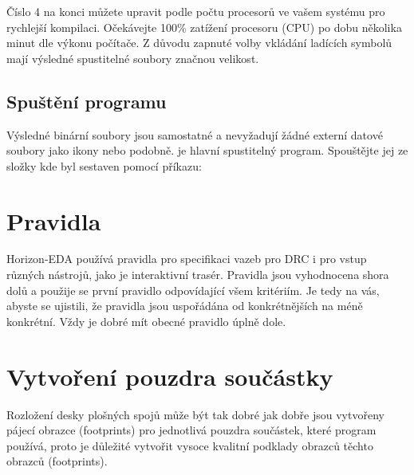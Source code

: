 \documentclass[letterpaper,10pt,czech]{sphinxmanual}
\begin{document}
Číslo 4 na konci můžete upravit podle počtu procesorů ve vašem systému pro rychlejší kompilaci. Očekávejte 100\% zatížení procesoru (CPU) po dobu několika minut dle výkonu počítače. Z důvodu zapnuté volby vkládání ladících symbolů mají výsledné spustitelné soubory značnou velikost.


\section{Spuštění programu}
\label{\detokenize{build-linux_cz:spusteni-programu}}
Výsledné binární soubory jsou samostatné a nevyžadují žádné externí
datové soubory jako ikony nebo podobně.
 je hlavní spustitelný program. Spouštějte jej ze složky kde byl sestaven pomocí příkazu:

\begin{sphinxVerbatim}[commandchars=\\\{\}]
\end{sphinxVerbatim}


\chapter{Pravidla}
\label{\detokenize{rules_cz:pravidla}}\label{\detokenize{rules_cz::doc}}
Horizon-EDA používá pravidla pro specifikaci vazeb pro DRC i pro vstup různých nástrojů, jako je interaktivní trasér. Pravidla jsou vyhodnocena shora dolů a použije se první pravidlo odpovídající všem kritériím. Je tedy na vás, abyste se ujistili, že pravidla jsou uspořádána od konkrétnějších na méně konkrétní. Vždy je dobré mít obecné pravidlo úplně dole.


\chapter{Vytvoření pouzdra součástky}
\label{\detokenize{create-package_cz:vytvoreni-pouzdra-soucastky}}\label{\detokenize{create-package_cz::doc}}
Rozložení desky plošných spojů může být tak dobré jak dobře jsou vytvořeny pájecí obrazce (footprints) pro jednotlivá pouzdra součástek, které program používá, proto je důležité vytvořit vysoce kvalitní podklady obrazců těchto obrazců (footprints).
\end{document}
